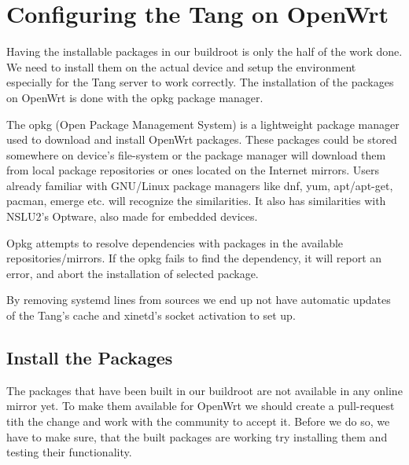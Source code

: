 \chapter{Configuring the Tang on OpenWrt}\label{config}

Having the installable packages in our buildroot is only the half of the work done.
We need to install them on the actual device and setup the environment especially for the Tang server to work correctly.
The installation of the packages on OpenWrt is done with the opkg package manager.

The opkg (Open Package Management System) is a lightweight package manager used to download and install OpenWrt packages.
These packages could be stored somewhere on device's file-system or the package manager will download them from local package repositories or ones located on the Internet mirrors.
Users already familiar with GNU/Linux package managers like dnf, yum, apt/apt-get, pacman, emerge etc. will recognize the similarities.
It also has similarities with NSLU2's Optware, also made for embedded devices.

Opkg attempts to resolve dependencies with packages in the available repositories/mirrors.
If the opkg fails to find the dependency, it will report an error, and abort the installation of selected package.

By removing systemd lines from sources we end up not have automatic updates of the Tang's cache and xinetd's socket activation to set up.



\section{Install the Packages}

The packages that have been built in our buildroot are not available in any online mirror yet.
To make them available for OpenWrt we should create a pull-request tith the change and work with the community to accept it.
Before we do so, we have to make sure, that the built packages are working try installing them and testing their functionality.

